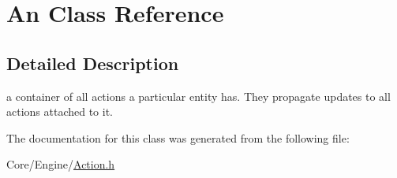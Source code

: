 \hypertarget{classAn}{\section{An Class Reference}
\label{classAn}
}


\subsection{Detailed Description}
a container of all actions a particular entity has. They propagate updates to all actions attached to it. 

The documentation for this class was generated from the following file\-:\begin{DoxyCompactItemize}
\item 
Core/\-Engine/\hyperlink{Action_8h}{Action.\-h}\end{DoxyCompactItemize}

